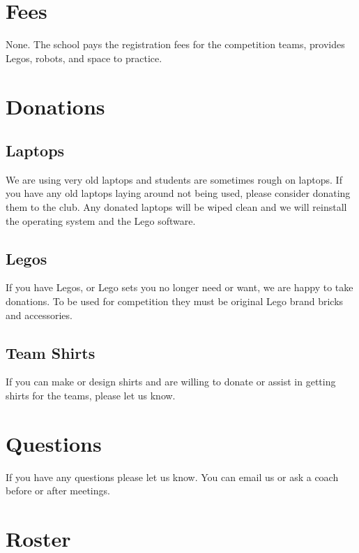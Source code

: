 \documentclass[letter]{article}
\begin{document}
\section{Fees}

None.  The school pays the registration fees for the competition teams, provides Legos, robots, and space to practice.

\hypertarget{donations}{%
\section{Donations}\label{donations}}

\subsection{Laptops}

We are using very old laptops and students are sometimes rough on laptops.  If you have any old laptops laying around not being used, please consider donating them to the club.  Any donated laptops will be wiped clean and we will reinstall the operating system and the Lego software.

\subsection{Legos}

If you have Legos, or Lego sets you no longer need or want, we are happy to take donations.  To be used for competition they must be original Lego brand bricks and accessories.

\subsection{Team Shirts}

If you can make or design shirts and are willing to donate or assist in getting shirts for the teams, please let us know.

\section{Questions}

If you have any questions please let us know. You can email us or ask a coach
before or after meetings.

\clearpage

\section{Roster}
\end{document}
